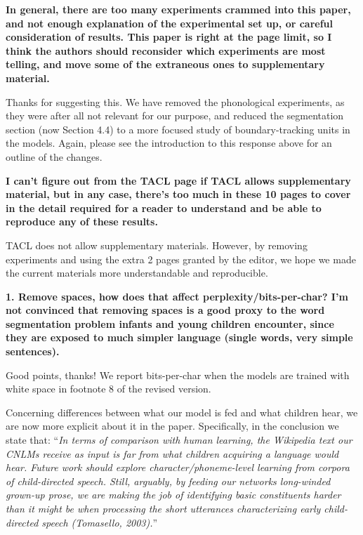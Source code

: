 \documentclass{article}[11pt,a4paper,oneside]
\begin{document}
\textbf{In general, there are too many experiments crammed into this paper, and not enough explanation of the experimental set up, or careful consideration of results.  This paper is right at the page limit, so I think the authors should reconsider which experiments are most telling, and move some of the extraneous ones to supplementary material.}

Thanks for suggesting this. We have removed the phonological experiments, as they were after all not relevant for our purpose, and reduced the segmentation section (now Section 4.4) to a more focused study of boundary-tracking units in the models. Again, please see the introduction to this response above for an outline of the changes.
\newline

\textbf{I can't figure out from the TACL page if TACL allows supplementary material, but in any case, there's too much in these 10 pages to cover in the detail required for a reader to understand and be able to reproduce any of these results.}

TACL does not allow supplementary materials. However, by removing experiments and using the extra 2 pages granted by the editor, we hope we made the current materials more understandable and reproducible.
\newline

\textbf{1. Remove spaces, how does that affect perplexity/bits-per-char? I'm not convinced that removing spaces is a good proxy to the word segmentation problem infants and young children encounter, since they are exposed to much simpler language (single words, very simple sentences).}

Good points, thanks! We report bits-per-char when the models are trained with white space in footnote 8 of the revised version.

Concerning differences between what our model is fed and what children hear, we are now more explicit about it in the paper. Specifically, in the conclusion we state that: ``\textit{In terms of  comparison with human learning, the Wikipedia text our CNLMs receive as input is far from what children acquiring a language would hear. Future work should explore character/phoneme-level learning from corpora of child-directed speech. Still, arguably, by feeding our networks long-winded grown-up prose, we are making the job of identifying basic constituents harder than it might be when processing the short utterances characterizing early child-directed speech (Tomasello, 2003).}''
\end{document}
